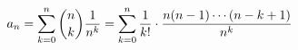 \documentclass[preview]{standalone}
\begin{document}
\begin{align*}
\special{dvisvgm:raw <g id='unique000'>}a_n=\sum_{k=0}^{n}\binom{n}{k}\dfrac{1}{n^k}=\sum_{k=0}^{n}\dfrac{1}{k!}\cdot\dfrac{n(n-1)\cdots(n-k+1)}{n^k}\special{dvisvgm:raw </g>}
\end{align*}
\end{document}
